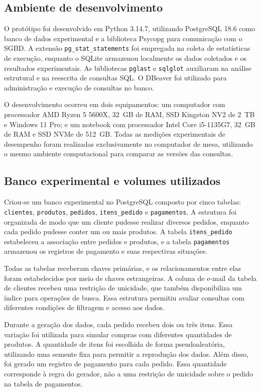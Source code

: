 \documentclass{UNESC}
\newcommand{\codigo}[1]{\texttt{#1}}
\begin{document}
\subsection{Ambiente de desenvolvimento}

O protótipo foi desenvolvido em Python 3.14.7, utilizando PostgreSQL 18.6 como banco de dados experimental e a biblioteca Psycopg para comunicação com o SGBD. A extensão \codigo{pg\_stat\_statements} foi empregada na coleta de estatísticas de execução, enquanto o SQLite armazenou localmente os dados coletados e os resultados experimentais. As bibliotecas \codigo{pglast} e \codigo{sqlglot} auxiliaram na análise estrutural e na reescrita de consultas SQL. O DBeaver foi utilizado para administração e execução de consultas no banco.

O desenvolvimento ocorreu em dois equipamentos: um computador com processador AMD Ryzen 5 5600X, 32~GB de RAM, SSD Kingston NV2 de 2~TB e Windows 11 Pro; e um notebook com processador Intel Core i5-1135G7, 32~GB de RAM e SSD NVMe de 512~GB. Todas as medições experimentais de desempenho foram realizadas exclusivamente no computador de mesa, utilizando o mesmo ambiente computacional para comparar as versões das consultas.


\subsection{Banco experimental e volumes utilizados}

Criou-se um banco experimental no PostgreSQL composto por cinco tabelas: \codigo{clientes}, \codigo{produtos}, \codigo{pedidos}, \codigo{itens\_pedido} e \codigo{pagamentos}. A estrutura foi organizada de modo que um cliente pudesse realizar diversos pedidos, enquanto cada pedido pudesse conter um ou mais produtos. A tabela \codigo{itens\_pedido} estabeleceu a associação entre pedidos e produtos, e a tabela \codigo{pagamentos} armazenou os registros de pagamento e suas respectivas situações.

Todas as tabelas receberam chaves primárias, e os relacionamentos entre elas foram estabelecidos por meio de chaves estrangeiras. A coluna de e-mail da tabela de clientes recebeu uma restrição de unicidade, que também disponibiliza um índice para operações de busca. Essa estrutura permitiu avaliar consultas com diferentes condições de filtragem e acesso aos dados.

Durante a geração dos dados, cada pedido recebeu dois ou três itens. Essa variação foi utilizada para simular compras com diferentes quantidades de produtos. A quantidade de itens foi escolhida de forma pseudoaleatória, utilizando uma semente fixa para permitir a reprodução dos dados. Além disso, foi gerado um registro de pagamento para cada pedido. Essa quantidade corresponde à regra do gerador, não a uma restrição de unicidade sobre o pedido na tabela de pagamentos.
\end{document}
